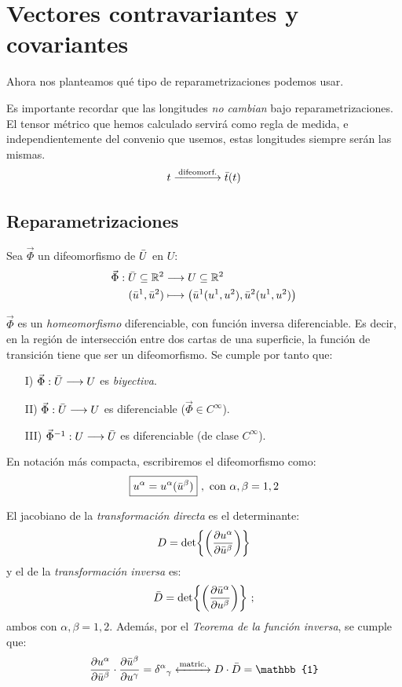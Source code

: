 \section{Vectores contravariantes y covariantes}
Ahora nos planteamos qué tipo de reparametrizaciones podemos usar.

Es importante recordar que las longitudes \emph{no cambian} bajo reparametrizaciones. El tensor métrico que hemos calculado servirá como regla de medida, e independientemente del convenio que usemos, estas longitudes siempre serán las mismas.
$$
t\xlongrightarrow{\text{difeomorf.}}\Bar{t}(t)
$$
\subsection{Reparametrizaciones}
Sea $\vec{\Phi}$ un difeomorfismo de $\Bar{U}$ en $U$:
\begin{align*}
    \vec{\Phi}:\Bar{U}\subseteq \mathbb{R}^2 &\longrightarrow U\subseteq \mathbb{R}^2\\
    (\Bar{u}^1,\Bar{u}^2)&\longmapsto \left ( \Bar{u}^1(u^1,u^2),\Bar{u}^2(u^1,u^2) \right )
\end{align*}

$\vec{\Phi}$ es un \emph{homeomorfismo} diferenciable, con función inversa diferenciable. Es decir, en la región de intersección entre dos cartas de una superficie, la función de transición tiene que ser un difeomorfismo. Se cumple por tanto que:
\begin{enumerate}
    \item[I)] $\vec{\Phi}:\Bar{U}\longrightarrow U$ es \emph{biyectiva}.
    \item[II)] $\vec{\Phi}:\Bar{U}\longrightarrow U$ es diferenciable ($\vec{\Phi}\in C^\infty$).
    \item[III)] $\vec{\Phi}^{-1}:U\longrightarrow \Bar{U}$ es diferenciable (de clase $C^\infty$).
\end{enumerate}

En notación más compacta, escribiremos el difeomorfismo como:
$$
\boxed{u^\alpha=u^\alpha (\Bar{u}^\beta)} \ , \ \text{con }\alpha,\beta=1,2
$$

El jacobiano de la \emph{transformación directa} es el determinante:
$$
D=\det{\left ( \pdv{u^\alpha}{\Bar{u}^\beta} \right )}
$$
y el de la \emph{transformación inversa} es:
$$
\Bar{D}=\det{\left ( \pdv{\Bar{u}^\alpha}{u^\beta} \right )} \ ;
$$
ambos con $\alpha,\beta=1,2$. Además, por el \emph{Teorema de la función inversa}, se cumple que:
$$
\pdv{u^\alpha}{\Bar{u}^\beta}\cdot \pdv{\Bar{u}^\beta}{u^\gamma }=\delta ^\alpha {}_\gamma  \xleftrightarrow{\text{matric.}} D\cdot \Bar{D}=\mathbb{1}
$$


